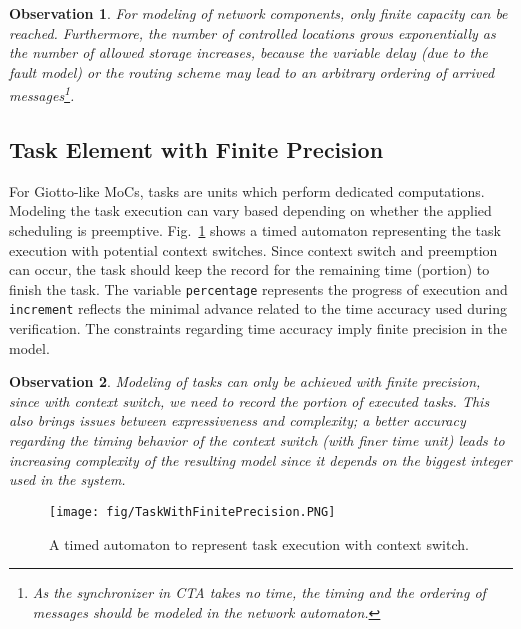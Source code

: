 \documentclass[10pt, a4paper, onecolumn, conference, compsocconf]{IEEEtran}
\newtheorem{obser}{Observation}
\begin{document}
\begin{obser}
For modeling of network components, only finite capacity can be reached.
Furthermore, the number of controlled locations grows exponentially as the number of allowed storage increases, because
the variable delay (due to the fault model) or the routing scheme may lead to an arbitrary ordering of arrived messages\footnote{As the
synchronizer in CTA takes no time, the timing and the ordering of messages should be modeled in the network automaton.}.
\end{obser}


\subsection{Task Element with Finite Precision\label{sec.Task.Element.Finite.Precision}}
For Giotto-like MoCs, tasks are units which perform dedicated computations. Modeling the task execution can vary based depending on whether the applied scheduling is preemptive.
Fig.~\ref{fig:TA.task} shows a timed automaton representing the task execution with potential context switches. Since context switch and preemption can occur, the
task should keep the record for the remaining time (portion) to finish the task. The variable \verb"percentage" represents the progress of execution and \verb"increment" reflects the minimal advance related to the time accuracy used during verification. The constraints regarding time accuracy imply finite precision in the model.

\begin{obser}
Modeling of tasks can only be achieved with finite precision, since with context switch, we need to record the portion
of executed tasks. This also brings issues between expressiveness and complexity;
a better accuracy regarding the timing behavior of the context switch (with finer time unit) leads to increasing complexity of the resulting model since it depends on the biggest integer used
in the system.
\end{obser}

\begin{figure}
 \centering
 \texttt{[image: fig/TaskWithFinitePrecision.PNG]}
 \caption{A timed automaton to represent task execution with context switch.}
 \label{fig:TA.task}
\end{figure}
\end{document}
